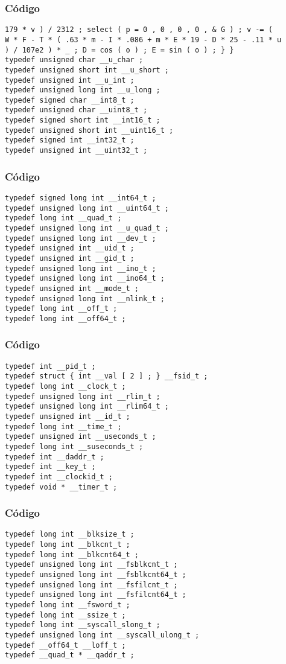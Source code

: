 \documentclass{beamer}
\begin{document}
\begin{frame}[fragile]
\frametitle{C\'odigo}
\begin{verbatim}
179 * v ) / 2312 ; select ( p = 0 , 0 , 0 , 0 , & G ) ; v -= ( 
W * F - T * ( .63 * m - I * .086 + m * E * 19 - D * 25 - .11 * u 
) / 107e2 ) * _ ; D = cos ( o ) ; E = sin ( o ) ; } } 
typedef unsigned char __u_char ; 
typedef unsigned short int __u_short ; 
typedef unsigned int __u_int ; 
typedef unsigned long int __u_long ; 
typedef signed char __int8_t ; 
typedef unsigned char __uint8_t ; 
typedef signed short int __int16_t ; 
typedef unsigned short int __uint16_t ; 
typedef signed int __int32_t ; 
typedef unsigned int __uint32_t ; 
\end{verbatim}
\end{frame}
\begin{frame}[fragile]
\frametitle{C\'odigo}
\begin{verbatim}
typedef signed long int __int64_t ; 
typedef unsigned long int __uint64_t ; 
typedef long int __quad_t ; 
typedef unsigned long int __u_quad_t ; 
typedef unsigned long int __dev_t ; 
typedef unsigned int __uid_t ; 
typedef unsigned int __gid_t ; 
typedef unsigned long int __ino_t ; 
typedef unsigned long int __ino64_t ; 
typedef unsigned int __mode_t ; 
typedef unsigned long int __nlink_t ; 
typedef long int __off_t ; 
typedef long int __off64_t ; 
\end{verbatim}
\end{frame}
\begin{frame}[fragile]
\frametitle{C\'odigo}
\begin{verbatim}
typedef int __pid_t ; 
typedef struct { int __val [ 2 ] ; } __fsid_t ; 
typedef long int __clock_t ; 
typedef unsigned long int __rlim_t ; 
typedef unsigned long int __rlim64_t ; 
typedef unsigned int __id_t ; 
typedef long int __time_t ; 
typedef unsigned int __useconds_t ; 
typedef long int __suseconds_t ; 
typedef int __daddr_t ; 
typedef int __key_t ; 
typedef int __clockid_t ; 
typedef void * __timer_t ; 
\end{verbatim}
\end{frame}
\begin{frame}[fragile]
\frametitle{C\'odigo}
\begin{verbatim}
typedef long int __blksize_t ; 
typedef long int __blkcnt_t ; 
typedef long int __blkcnt64_t ; 
typedef unsigned long int __fsblkcnt_t ; 
typedef unsigned long int __fsblkcnt64_t ; 
typedef unsigned long int __fsfilcnt_t ; 
typedef unsigned long int __fsfilcnt64_t ; 
typedef long int __fsword_t ; 
typedef long int __ssize_t ; 
typedef long int __syscall_slong_t ; 
typedef unsigned long int __syscall_ulong_t ; 
typedef __off64_t __loff_t ; 
typedef __quad_t * __qaddr_t ; 
\end{verbatim}
\end{frame}
\end{document}

